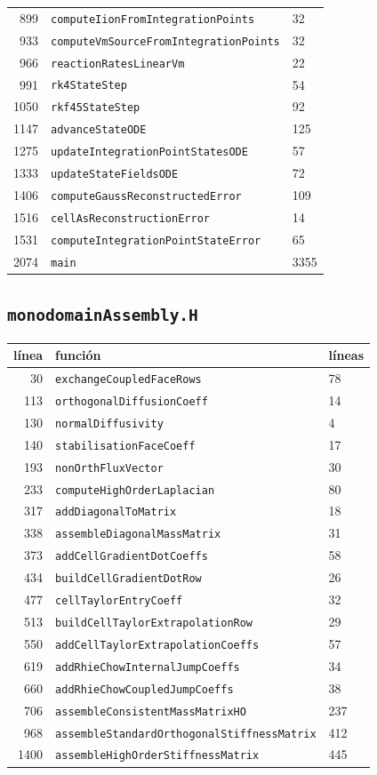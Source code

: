 \documentclass[11pt,a4paper]{article}
\begin{document}
\begin{longtable}{rll}
899 & \texttt{computeIionFromIntegrationPoints} & 32 \\
933 & \texttt{computeVmSourceFromIntegrationPoints} & 32 \\
966 & \texttt{reactionRatesLinearVm} & 22 \\
991 & \texttt{rk4StateStep} & 54 \\
1050 & \texttt{rkf45StateStep} & 92 \\
1147 & \texttt{advanceStateODE} & 125 \\
1275 & \texttt{updateIntegrationPointStatesODE} & 57 \\
1333 & \texttt{updateStateFieldsODE} & 72 \\
1406 & \texttt{computeGaussReconstructedError} & 109 \\
1516 & \texttt{cellAsReconstructionError} & 14 \\
1531 & \texttt{computeIntegrationPointStateError} & 65 \\
2074 & \texttt{main} & 3355 \\
\bottomrule
\end{longtable}
\subsection*{\texttt{monodomainAssembly.H}}
\begin{longtable}{rll}
\toprule
línea & función & líneas \\
\midrule
\endhead
30 & \texttt{exchangeCoupledFaceRows} & 78 \\
113 & \texttt{orthogonalDiffusionCoeff} & 14 \\
130 & \texttt{normalDiffusivity} & 4 \\
140 & \texttt{stabilisationFaceCoeff} & 17 \\
193 & \texttt{nonOrthFluxVector} & 30 \\
233 & \texttt{computeHighOrderLaplacian} & 80 \\
317 & \texttt{addDiagonalToMatrix} & 18 \\
338 & \texttt{assembleDiagonalMassMatrix} & 31 \\
373 & \texttt{addCellGradientDotCoeffs} & 58 \\
434 & \texttt{buildCellGradientDotRow} & 26 \\
477 & \texttt{cellTaylorEntryCoeff} & 32 \\
513 & \texttt{buildCellTaylorExtrapolationRow} & 29 \\
550 & \texttt{addCellTaylorExtrapolationCoeffs} & 57 \\
619 & \texttt{addRhieChowInternalJumpCoeffs} & 34 \\
660 & \texttt{addRhieChowCoupledJumpCoeffs} & 38 \\
706 & \texttt{assembleConsistentMassMatrixHO} & 237 \\
968 & \texttt{assembleStandardOrthogonalStiffnessMatrix} & 412 \\
1400 & \texttt{assembleHighOrderStiffnessMatrix} & 445 \\
\bottomrule
\end{longtable}
\end{document}
